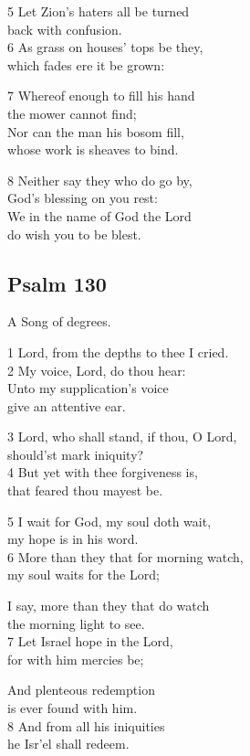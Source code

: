 \begin{multicols}{3}
5 Let Zion’s haters all be turned\\
back with confusion.\\
6 As grass on houses’ tops be they,\\
which fades ere it be grown:

7 Whereof enough to fill his hand\\
the mower cannot find;\\
Nor can the man his bosom fill,\\
whose work is sheaves to bind.

8 Neither say they who do go by,\\
God’s blessing on you rest:\\
We in the name of God the Lord\\
do wish you to be blest.

\begin{center}
\quad{}\quad{}
\end{center}


\subsection*{Psalm 130}

A Song of degrees.

1 Lord, from the depths to thee I cried.\\
2 My voice, Lord, do thou hear:\\
Unto my supplication’s voice\\
give an attentive ear.

3 Lord, who shall stand, if thou, O Lord,\\
should’st mark iniquity?\\
4 But yet with thee forgiveness is,\\
that feared thou mayest be.

5 I wait for God, my soul doth wait,\\
my hope is in his word.\\
6 More than they that for morning watch,\\
my soul waits for the Lord;

I say, more than they that do watch\\
the morning light to see.\\
7 Let Israel hope in the Lord,\\
for with him mercies be;

And plenteous redemption\\
is ever found with him.\\
8 And from all his iniquities\\
he Isr’el shall redeem.

\end{multicols}



